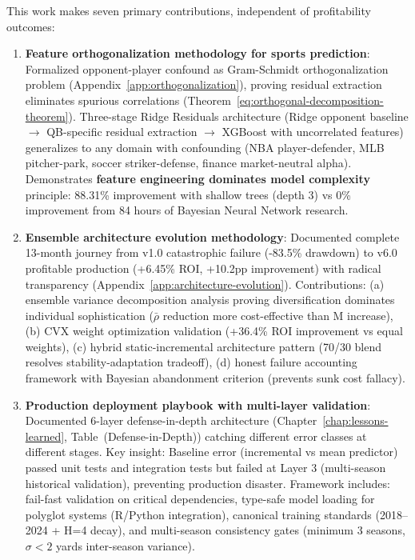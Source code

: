 This work makes seven primary contributions, independent of profitability outcomes:
\begin{enumerate}
  \item \textbf{Feature orthogonalization methodology for sports prediction}: Formalized opponent-player confound as Gram-Schmidt orthogonalization problem (Appendix~\ref{app:orthogonalization}), proving residual extraction eliminates spurious correlations (Theorem~\ref{eq:orthogonal-decomposition-theorem}). Three-stage Ridge Residuals architecture (Ridge opponent baseline $\to$ QB-specific residual extraction $\to$ XGBoost with uncorrelated features) generalizes to any domain with confounding (NBA player-defender, MLB pitcher-park, soccer striker-defense, finance market-neutral alpha). Demonstrates \textbf{feature engineering dominates model complexity} principle: 88.31\% improvement with shallow trees (depth 3) vs 0\% improvement from 84 hours of Bayesian Neural Network research.

  \item \textbf{Ensemble architecture evolution methodology}: Documented complete 13-month journey from v1.0 catastrophic failure (-83.5\% drawdown) to v6.0 profitable production (+6.45\% ROI, +10.2pp improvement) with radical transparency (Appendix~\ref{app:architecture-evolution}). Contributions: (a) ensemble variance decomposition analysis proving diversification dominates individual sophistication ($\bar{\rho}$ reduction more cost-effective than M increase), (b) CVX weight optimization validation (+36.4\% ROI improvement vs equal weights), (c) hybrid static-incremental architecture pattern (70/30 blend resolves stability-adaptation tradeoff), (d) honest failure accounting framework with Bayesian abandonment criterion (prevents sunk cost fallacy).

  \item \textbf{Production deployment playbook with multi-layer validation}: Documented 6-layer defense-in-depth architecture (Chapter~\ref{chap:lessons-learned}, %
Table~(Defense-in-Depth)) catching different error classes at different stages. Key insight: Baseline error (incremental vs mean predictor) passed unit tests and integration tests but failed at Layer 3 (multi-season historical validation), preventing production disaster. Framework includes: fail-fast validation on critical dependencies, type-safe model loading for polyglot systems (R/Python integration), canonical training standards (2018--2024 + H=4 decay), and multi-season consistency gates (minimum 3 seasons, $\sigma < 2$ yards inter-season variance).


\end{enumerate}
